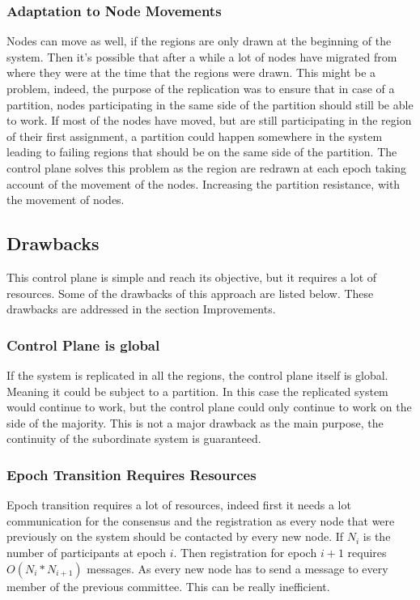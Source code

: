 \documentclass[a4paper,11pt,oneside]{report}
\begin{document}
\subsubsection{Adaptation to Node Movements}
Nodes can move as well, if the regions are only drawn at the beginning of the
system. Then it's possible that after a while a lot of nodes have migrated from
where they were at the time that the regions were drawn. This might be a
problem, indeed, the purpose of the replication was to ensure that in case of a
partition, nodes participating in the same side of the partition should still
be able to work. If most of the nodes have moved, but are still participating
in the region of their first assignment, a partition could happen somewhere in
the system leading to failing regions that should be on the same side of the
partition. The control plane solves this problem as the region are redrawn at
each epoch taking account of the movement of the nodes. Increasing the
partition resistance, with the movement of nodes.

\subsection{Drawbacks}
This control plane is simple and reach its objective, but it requires a lot of
resources. Some of the drawbacks of this approach are listed below. 
These drawbacks are addressed in the section Improvements.  

\subsubsection{Control Plane is global}
If the system is replicated in all the regions, the control plane itself is
global. Meaning it could be subject to a partition. In this case the replicated
system would continue to work, but the control plane could only continue to
work on the side of the majority. This is not a major drawback as the main
purpose, the continuity of the subordinate system is guaranteed.

\subsubsection{Epoch Transition Requires Resources}
Epoch transition requires a lot of resources, indeed first it needs a lot
communication for the consensus and the registration as every node that were
previously on the system should be contacted by every new node. If $N_i$ is
the number of participants at epoch $i$. Then registration for epoch $i+1$
requires $O(N_i * N_{i+1})$ messages. As every new node has to send a message
to every member of the previous committee. This can be really inefficient. 
\end{document}
